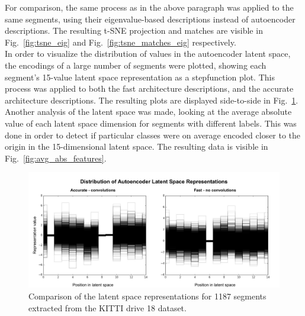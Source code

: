 For comparison, the same process as in the above paragraph was applied to the same segments, using their eigenvalue-based descriptions instead of autoencoder descriptions. The resulting t-SNE projection and matches are visible in Fig.~\ref{fig:tsne_eig} and Fig.~\ref{fig:tsne_matches_eig} respectively.\\

In order to visualize the distribution of values in the autoencoder latent space, the encodings of a large number of segments were plotted, showing each segment's 15-value latent space representation as a stepfunction plot. This process was applied to both the fast architecture descriptions, and the accurate architecture descriptions. The resulting plots are displayed side-to-side in Fig.~\ref{fig:fastvaccurate_features}.\\

Another analysis of the latent space was made, looking at the average absolute value of each latent space dimension for segments with different labels. This was done in order to detect if particular classes were on average encoded closer to the origin in the 15-dimensional latent space. The resulting data is visible in Fig.~\ref{fig:avg_abs_features}.\\

\begin{figure}
  \centering
  \includegraphics[width=5.2in]{images/fastvaccuratefeatures.pdf}
  \caption{Comparison of the latent space representations for 1187 segments extracted from the KITTI drive 18 dataset.}
  \label{fig:fastvaccurate_features}
\end{figure}

